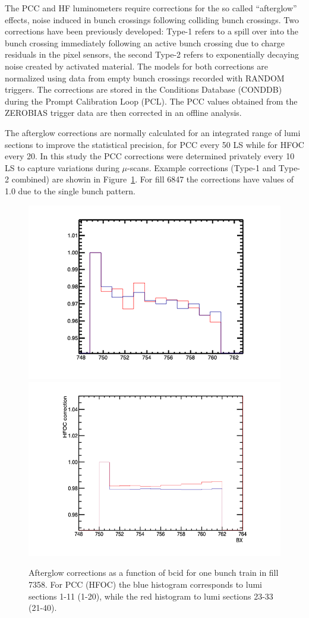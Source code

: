 
The PCC and HF luminometers  require corrections for the so called ``afterglow'' effects, noise induced in bunch crossings following colliding bunch crossings.
Two corrections have been previously developed: Type-1 refers to a spill over into the bunch crossing immediately following an active bunch crossing due to charge residuals in the pixel sensors, the second Type-2 refers to exponentially decaying noise created by activated material.
The models for both corrections are normalized using data from empty bunch crossings recorded with RANDOM triggers.
The corrections are stored in the Conditions Database (CONDDB) during the Prompt Calibration Loop (PCL).
The PCC values obtained from the ZEROBIAS trigger data are then corrected in an offline analysis.

The afterglow corrections are normally calculated for an integrated range of lumi sections to improve the statistical precision, for PCC every 50 LS while for HFOC every 20. In this study the PCC corrections were determined privately every 10 LS to capture variations during $\mu$-scans.
Example corrections (Type-1 and Type-2 combined) are showin in Figure~\ref{fig:afterglow}.
For fill 6847 the corrections have values of 1.0 due to the single bunch pattern.

\begin{figure}[t]
  \begin{center}
    \includegraphics[width=0.47\linewidth]{plots/AfterglowCorrections_7358_PCC.png}
    \includegraphics[width=0.47\linewidth]{plots/AfterglowCorrections_7358_HFOC.png}
    \caption{
      Afterglow corrections as a function of bcid for one bunch train in fill 7358.
      For PCC (HFOC) the blue histogram corresponds to lumi sections 1-11 (1-20), while the red histogram to lumi sections 23-33 (21-40).
    \label{fig:afterglow}
    }
  \end{center}
\end{figure}


